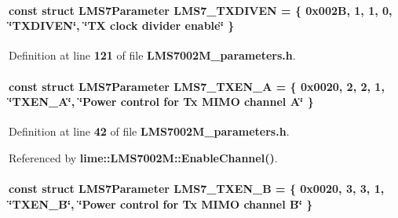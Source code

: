\paragraph[{L\+M\+S7\+\_\+\+T\+X\+D\+I\+V\+EN}]{\setlength{\rightskip}{0pt plus 5cm}const struct {\bf L\+M\+S7\+Parameter} L\+M\+S7\+\_\+\+T\+X\+D\+I\+V\+EN = \{ 0x002\+B, 1, 1, 0, \char`\"{}\+T\+X\+D\+I\+V\+E\+N\char`\"{}, \char`\"{}\+T\+X clock divider enable\char`\"{} \}\hspace{0.3cm}{\ttfamily [static]}}\label{LMS7002M__parameters_8h_a67cedcf17ce1fd9f69234f5d7c131a01}


Definition at line {\bf 121} of file {\bf L\+M\+S7002\+M\+\_\+parameters.\+h}.

\paragraph[{L\+M\+S7\+\_\+\+T\+X\+E\+N\+\_\+A}]{\setlength{\rightskip}{0pt plus 5cm}const struct {\bf L\+M\+S7\+Parameter} L\+M\+S7\+\_\+\+T\+X\+E\+N\+\_\+A = \{ 0x0020, 2, 2, 1, \char`\"{}\+T\+X\+E\+N\+\_\+\+A\char`\"{}, \char`\"{}\+Power control for Tx M\+I\+M\+O channel A\char`\"{} \}\hspace{0.3cm}{\ttfamily [static]}}\label{LMS7002M__parameters_8h_a0f87a528114098712a6e3420e9a5c898}


Definition at line {\bf 42} of file {\bf L\+M\+S7002\+M\+\_\+parameters.\+h}.



Referenced by {\bf lime\+::\+L\+M\+S7002\+M\+::\+Enable\+Channel()}.

\paragraph[{L\+M\+S7\+\_\+\+T\+X\+E\+N\+\_\+B}]{\setlength{\rightskip}{0pt plus 5cm}const struct {\bf L\+M\+S7\+Parameter} L\+M\+S7\+\_\+\+T\+X\+E\+N\+\_\+B = \{ 0x0020, 3, 3, 1, \char`\"{}\+T\+X\+E\+N\+\_\+\+B\char`\"{}, \char`\"{}\+Power control for Tx M\+I\+M\+O channel B\char`\"{} \}\hspace{0.3cm}{\ttfamily [static]}}\label{LMS7002M__parameters_8h_a6f26eadb712f6da8499cdadfba9ecce3}



